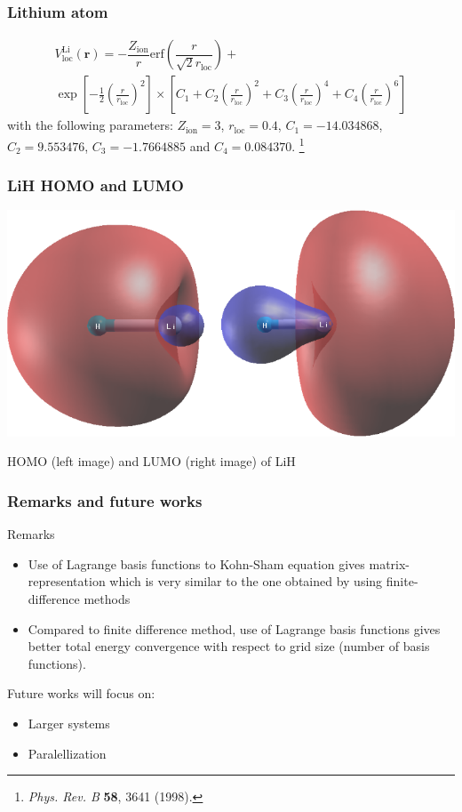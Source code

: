 \documentclass[10pt,t]{beamer}
\begin{document}
\begin{frame}
\frametitle{Lithium atom}

\begin{multline*}
V^{\mathrm{Li}}_{\mathrm{loc}}(\mathbf{r}) = 
-\dfrac{Z_{\mathrm{ion}}}{r}
\mathrm{erf}\left(
\dfrac{r}{\sqrt{2}r_{\mathrm{loc}}}
\right) + \\
\exp
\left[ -\frac{1}{2}
\left( \frac{r}{r_{\mathrm{loc}}}\right)^2
\right]
\times
\left[
C_{1} +
C_{2}\left( \frac{r}{r_{\mathrm{loc}}}\right)^2 +
C_{3}\left( \frac{r}{r_{\mathrm{loc}}}\right)^4 +
C_{4}\left( \frac{r}{r_{\mathrm{loc}}}\right)^6
\right]
\end{multline*}
with the following parameters:
$Z_{\mathrm{ion}} = 3$, $r_{\mathrm{loc}} = 0.4$,
$C_{1} = -14.034868$, $C_{2} = 9.553476$, $C_{3} = -1.7664885$
and $C_{4} = 0.084370$.
\footnote{
  \textit{Phys. Rev. B}  \textbf{58}, 3641 (1998). 
}


\end{frame}

\begin{frame}[c]
\frametitle{LiH HOMO and LUMO}

{\centering
\includegraphics[scale=0.45]{images/LiH_HOMO_LUMO.png}
\par
HOMO (left image) and LUMO (right image) of LiH
\par}



\end{frame}

\begin{frame}[c]
\frametitle{Remarks and future works}

Remarks
\begin{itemize}
\item Use of Lagrange basis functions to Kohn-Sham equation gives
matrix-representation which is very similar to the one obtained by
using finite-difference methods
\item Compared to finite difference method, use of Lagrange basis functions
gives better total energy convergence with respect to grid size (number of basis
functions).
\end{itemize}

Future works will focus on:
\begin{itemize}
\item Larger systems
\item Paralellization
\end{itemize}

\end{frame}
\end{document}
